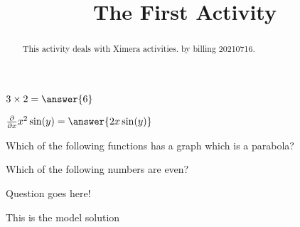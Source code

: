 \documentclass{ximera}
\title{The First Activity}
\begin{document}
  
\begin{abstract}  
This activity deals with Ximera activities.  
by billing 20210716.
\end{abstract}  
\maketitle  

\begin{question}
$3\times 2 = \answer{6}$
\end{question}


\begin{question}  
	$ \frac{\partial}{\partial x} x^2\sin(y) =  \answer{2x\sin(y)}$  
\end{question}


\begin{question}
Which of the following functions has a graph which is a parabola?
\begin{multipleChoice}
\end{multipleChoice}
\end{question}



\begin{question}
  Which of the following numbers are even?
  \begin{selectAll}
  \end{selectAll}
\end{question}



\begin{question}
Question goes here!
\begin{freeResponse}
This is the model solution %
\end{freeResponse}
\end{question}



\begin{center}  
\end{center}
\end{document}
